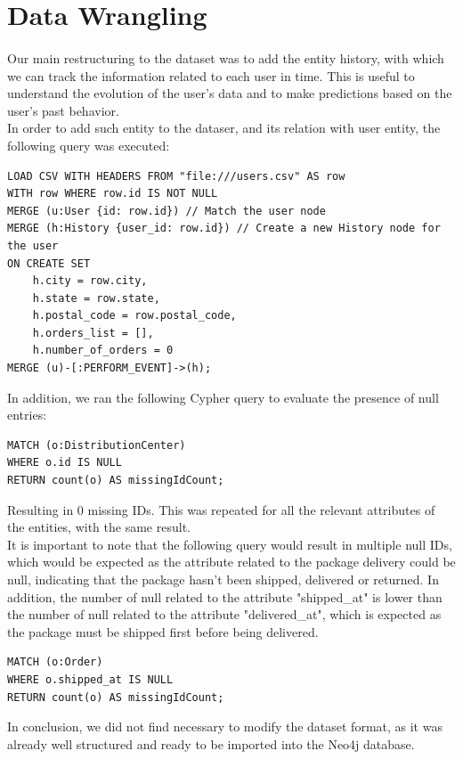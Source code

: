 \documentclass[a4paper,12pt]{article}
\begin{document}
\section{Data Wrangling}
\paragraph{} Our main restructuring to the dataset was to add the entity history, with which we can track the information related to each user in time. This is useful to understand the evolution of the user's data and to make predictions based on the user's past behavior.
\\
In order to add such entity to the dataser, and its relation with user entity, the following query was executed:
\begin{verbatim}
LOAD CSV WITH HEADERS FROM "file:///users.csv" AS row
WITH row WHERE row.id IS NOT NULL
MERGE (u:User {id: row.id}) // Match the user node
MERGE (h:History {user_id: row.id}) // Create a new History node for the user
ON CREATE SET 
    h.city = row.city,
    h.state = row.state,
    h.postal_code = row.postal_code,
    h.orders_list = [], 
    h.number_of_orders = 0
MERGE (u)-[:PERFORM_EVENT]->(h);
\end{verbatim}

In addition, we ran the following Cypher query to evaluate the presence of null entries:
\begin{verbatim}
MATCH (o:DistributionCenter)
WHERE o.id IS NULL
RETURN count(o) AS missingIdCount;
\end{verbatim}

Resulting in 0 missing IDs. This was repeated for all the relevant attributes of the entities, with the same result.
\\
It is important to note that the following query would result in multiple null IDs, which would be expected as the attribute related to the package delivery could be null, indicating that the package hasn't been shipped, delivered or returned. 
In addition, the number of null related to the attribute "shipped\_at" is lower than the number of null related to the attribute "delivered\_at", which is expected as the package must be shipped first before being delivered.
\begin{verbatim}
MATCH (o:Order)
WHERE o.shipped_at IS NULL
RETURN count(o) AS missingIdCount;
\end{verbatim}
In conclusion, we did not find necessary to modify the dataset format, as it was already well structured and ready to be imported into the Neo4j database. 
\end{document}
